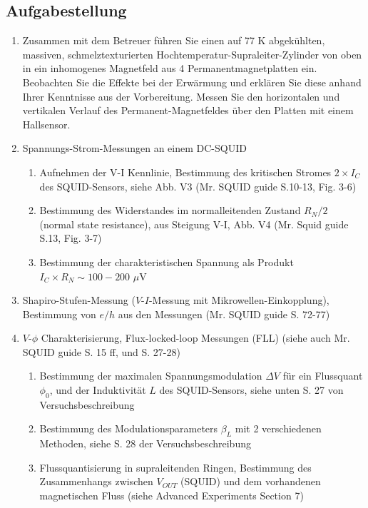 \documentclass{article}
\begin{document}
\subsection{Aufgabestellung}
\begin{enumerate}
    \item Zusammen mit dem Betreuer führen Sie einen auf 77 K abgekühlten, massiven, schmelztexturierten Hochtemperatur-Supraleiter-Zylinder von oben in ein inhomogenes Magnetfeld aus 4 Permanentmagnetplatten ein. Beobachten Sie die Effekte bei der Erwärmung und erklären Sie diese anhand Ihrer Kenntnisse aus der Vorbereitung. Messen Sie den horizontalen und vertikalen Verlauf des Permanent-Magnetfeldes über den Platten mit einem Hallsensor.
    
    \item Spannungs-Strom-Messungen an einem DC-SQUID
    \begin{enumerate}
        \item Aufnehmen der V-I Kennlinie, Bestimmung des kritischen Stromes $2\times I_C$ des SQUID-Sensors, siehe Abb. V3 (Mr. SQUID guide S.10-13, Fig. 3-6)
        \item Bestimmung des Widerstandes im normalleitenden Zustand $R_N/2$ (normal state resistance), aus Steigung V-I, Abb. V4 (Mr. Squid guide S.13, Fig. 3-7) \cite{mr_squid}
        \item Bestimmung der charakteristischen Spannung als Produkt $I_C \times R_N \sim 100 - 200$ $\mu$V
    \end{enumerate}
    
    \item Shapiro-Stufen-Messung ($V$-$I$-Messung mit Mikrowellen-Einkopplung), Bestimmung von $e/h$ aus den Messungen (Mr. SQUID guide S. 72-77) \cite{mr_squid}
    
    \item $V$-$\phi$ Charakterisierung, Flux-locked-loop Messungen (FLL) (siehe auch Mr. SQUID guide S. 15 ff, und S. 27-28) \cite{mr_squid}
    \begin{enumerate}
        \item Bestimmung der maximalen Spannungsmodulation $\Delta V$ für ein Flussquant $\phi_0$, und der Induktivität $L$ des SQUID-Sensors, siehe unten S. 27 von Versuchsbeschreibung \cite{fprak_manual}
        \item Bestimmung des Modulationsparameters $\beta_L$ mit 2 verschiedenen Methoden, siehe S. 28 der Versuchsbeschreibung \cite{fprak_manual}
        \item Flussquantisierung in supraleitenden Ringen, Bestimmung des Zusammenhangs zwischen $V_{OUT}$ (SQUID) und dem vorhandenen magnetischen Fluss (siehe Advanced Experiments Section 7) \cite{mr_squid} 
    \end{enumerate}
    

\end{enumerate}
\end{document}
